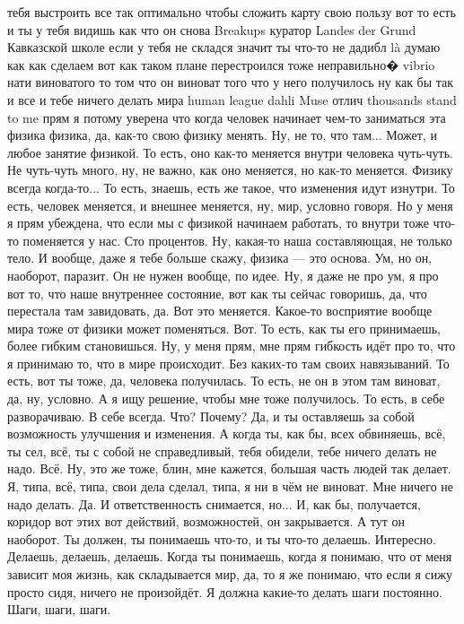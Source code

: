 тебя выстроить все так оптимально чтобы сложить карту свою пользу вот то есть и
ты у тебя видишь как что он снова Breakups куратор Landes der Grund Кавказской школе
если у тебя не складся значит ты что-то не дадибл là думаю как как сделаем вот как
таком плане перестроился тоже неправильно� vibrio нати виноватого то том что он виноват
того что у него получилось ну как бы так и все и тебе ничего делать мира human league
dahli Muse отлич thousands stand to me прям я потому уверена что когда человек начинает чем-то заниматься эта физика
физика, да, как-то свою физику менять.
Ну, не то, что там...
Может, и любое занятие физикой.
То есть, оно как-то меняется
внутри человека чуть-чуть.
Не чуть-чуть много, ну, не важно,
как оно меняется, но как-то меняется.
Физику всегда когда-то...
То есть, знаешь, есть же такое, что
изменения идут изнутри.
То есть, человек меняется, и внешнее
меняется, ну, мир, условно говоря.
Но у меня я прям убеждена, что
если мы с физикой начинаем работать,
то внутри тоже что-то поменяется у нас.
Сто процентов. Ну, какая-то наша
составляющая, не только тело.
И вообще, даже я тебе больше скажу,
физика — это
основа. Ум, но он, наоборот,
паразит. Он не нужен
вообще, по идее.
Ну, я даже не про ум, я про вот то, что
наше внутреннее состояние, вот как ты сейчас
говоришь, да, что перестала там завидовать,
да. Вот это меняется.
Какое-то восприятие вообще мира
тоже от физики может поменяться.
Вот.
То есть, как ты его принимаешь, более гибким становишься.
Ну, у меня прям, мне прям гибкость
идёт про то, что я принимаю
то, что в мире происходит.
Без каких-то там своих
навязываний. То есть,
вот ты тоже, да, человека получилась.
То есть, не он в этом там виноват, да, ну, условно.
А я ищу
решение, чтобы мне тоже получилось.
То есть, в себе разворачиваю.
В себе всегда. Что?
Почему? Да, и ты
оставляешь за собой
возможность
улучшения и изменения. А когда
ты, как бы, всех обвиняешь,
всё, ты сел, всё, ты
с собой не справедливый,
тебя обидели, тебе ничего делать не надо.
Всё. Ну, это же тоже, блин, мне кажется,
большая часть людей так делает.
Я, типа, всё, типа,
свои дела сделал, типа,
я ни в чём не виноват. Мне ничего не надо делать.
Да.
И ответственность
снимается, но...
И, как бы, получается, коридор вот этих вот
действий, возможностей, он
закрывается. А тут он наоборот.
Ты должен, ты понимаешь что-то,
и ты что-то делаешь.
Интересно. Делаешь, делаешь, делаешь.
Когда ты понимаешь, когда я понимаю,
что от меня зависит моя жизнь,
как складывается мир, да,
то я же понимаю, что
если я сижу
просто сидя, ничего не произойдёт.
Я должна какие-то делать шаги
постоянно. Шаги, шаги, шаги.
